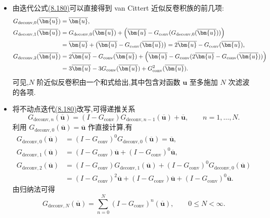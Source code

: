 \begin{note}
\label{note:van-cittert-approximate-deconvolution-properties}
\begin{itemize}
 \item 由迭代公式\hyperref[eq:van-cittert-iteration]{(8.180)}可以直接得到 van Cittert 近似反卷积族的前几项:
 \[
 \begin{aligned}
  G_{\mathrm{deconv},0}(\overline{\bm{u}})
   &=\overline{\bm{u}},\\
  G_{\mathrm{deconv},1}(\overline{\bm{u}})
   &=G_{\mathrm{deconv},0}(\overline{\bm{u}})
    +\Bigl(\overline{\bm{u}}
      -G_{\mathrm{conv}}(
       G_{\mathrm{deconv},0}(\overline{\bm{u}}))\Bigr)\\
   &=\overline{\bm{u}}
     +\bigl(\overline{\bm{u}}
       -G_{\mathrm{conv}}(\overline{\bm{u}})\bigr)
    =2\overline{\bm{u}}
      -G_{\mathrm{conv}}(\overline{\bm{u}}),\\
  G_{\mathrm{deconv},2}(\overline{\bm{u}})
   &=2\overline{\bm{u}}
     -G_{\mathrm{conv}}(\overline{\bm{u}})
     +\Bigl(\overline{\bm{u}}
       -G_{\mathrm{conv}}(
        2\overline{\bm{u}}
        -G_{\mathrm{conv}}(\overline{\bm{u}}))\Bigr)\\
   &=3\overline{\bm{u}}
     -3G_{\mathrm{conv}}(\overline{\bm{u}})
     +G_{\mathrm{conv}}^2(\overline{\bm{u}}).
 \end{aligned}
 \]
 可见,$N$ 阶近似反卷积由一个和式给出,其中包含对函数 $\bm{u}$ 至多施加 $N$ 次滤波的各项.
 \item 将不动点迭代\hyperref[eq:van-cittert-iteration]{(8.180)}改写,可得递推关系
 \[
  G_{\mathrm{deconv},n}(\overline{\bm{u}})
  =(I-G_{\mathrm{conv}})
    G_{\mathrm{deconv},n-1}(\overline{\bm{u}})
   +\overline{\bm{u}},
  \qquad n=1,\ldots,N.
 \]
 利用 $G_{\mathrm{deconv},0}(\overline{\bm{u}})
 =\overline{\bm{u}}$ 作直接计算,有
 \[
 \begin{aligned}
  G_{\mathrm{deconv},0}(\overline{\bm{u}})
   &=(I-G_{\mathrm{conv}})^0
     G_{\mathrm{deconv},0}(\overline{\bm{u}})
    =\overline{\bm{u}},\\
  G_{\mathrm{deconv},1}(\overline{\bm{u}})
   &=(I-G_{\mathrm{conv}})\overline{\bm{u}}
    +(I-G_{\mathrm{conv}})^0\overline{\bm{u}},\\
  G_{\mathrm{deconv},2}(\overline{\bm{u}})
   &=(I-G_{\mathrm{conv}})
      G_{\mathrm{deconv},1}(\overline{\bm{u}})
    +(I-G_{\mathrm{conv}})^0
      G_{\mathrm{deconv},0}(\overline{\bm{u}})\\
   &=(I-G_{\mathrm{conv}})^2\overline{\bm{u}}
    +(I-G_{\mathrm{conv}})\overline{\bm{u}}
    +(I-G_{\mathrm{conv}})^0\overline{\bm{u}}.
 \end{aligned}
 \]
 由归纳法可得
 \begin{equation}\label{eq:van-cittert-sum-representation}
  G_{\mathrm{deconv},N}(\overline{\bm{u}})
  =\sum_{n=0}^N
    (I-G_{\mathrm{conv}})^n(\overline{\bm{u}}),
  \qquad 0\le N<\infty.
 \end{equation}
\end{itemize}
\end{note}

